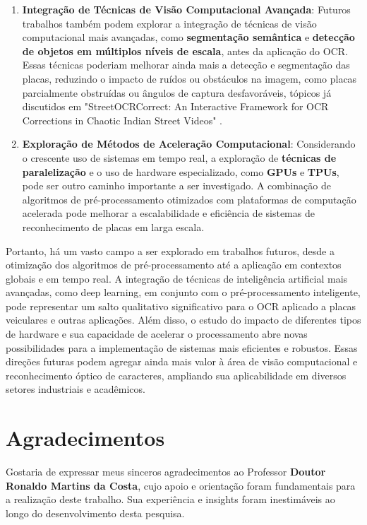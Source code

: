 \documentclass[conference]{IEEEtran}
\begin{document}
\begin{enumerate}
	\item \textbf{Integração de Técnicas de Visão Computacional Avançada}: Futuros trabalhos também podem explorar a integração de técnicas de visão computacional mais avançadas, como \textbf{segmentação semântica} e \textbf{detecção de objetos em múltiplos níveis de escala}, antes da aplicação do OCR. Essas técnicas poderiam melhorar ainda mais a detecção e segmentação das placas, reduzindo o impacto de ruídos ou obstáculos na imagem, como placas parcialmente obstruídas ou ângulos de captura desfavoráveis, tópicos já discutidos em "StreetOCRCorrect: An Interactive Framework for OCR Corrections in Chaotic Indian Street Videos" \cite{b13}.
	\item \textbf{Exploração de Métodos de Aceleração Computacional}: Considerando o crescente uso de sistemas em tempo real, a exploração de \textbf{técnicas de paralelização} e o uso de hardware especializado, como \textbf{GPUs} e \textbf{TPUs}, pode ser outro caminho importante a ser investigado. A combinação de algoritmos de pré-processamento otimizados com plataformas de computação acelerada pode melhorar a escalabilidade e eficiência de sistemas de reconhecimento de placas em larga escala.
\end{enumerate}

Portanto, há um vasto campo a ser explorado em trabalhos futuros, desde a otimização dos algoritmos de pré-processamento até a aplicação em contextos globais e em tempo real. A integração de técnicas de inteligência artificial mais avançadas, como deep learning, em conjunto com o pré-processamento inteligente, pode representar um salto qualitativo significativo para o OCR aplicado a placas veiculares e outras aplicações. Além disso, o estudo do impacto de diferentes tipos de hardware e sua capacidade de acelerar o processamento abre novas possibilidades para a implementação de sistemas mais eficientes e robustos. Essas direções futuras podem agregar ainda mais valor à área de visão computacional e reconhecimento óptico de caracteres, ampliando sua aplicabilidade em diversos setores industriais e acadêmicos.

\section{Agradecimentos}

Gostaria de expressar meus sinceros agradecimentos ao Professor \textbf{Doutor Ronaldo Martins da Costa}, cujo apoio e orientação foram fundamentais para a realização deste trabalho. Sua experiência e insights foram inestimáveis ao longo do desenvolvimento desta pesquisa.
\end{document}
